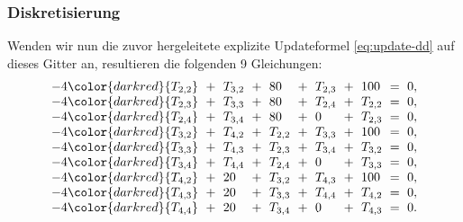 \subsubsection*{Diskretisierung}
Wenden wir nun die zuvor hergeleitete explizite Updateformel \eqref{eq:update-dd} auf dieses Gitter an, resultieren die folgenden 9 Gleichungen:
\begin{equation*}
\renewcommand{\arraycolsep}{3pt}
\begin{array}{cclclclclcl}
	-4\color{darkred}{T_{2,2}} &+& T_{3,2} &+& 80      &+& T_{2,3} &+& 100     &=& 0, \\
	-4\color{darkred}{T_{2,3}} &+& T_{3,3} &+& 80      &+& T_{2,4} &+& T_{2,2} &=& 0, \\
	-4\color{darkred}{T_{2,4}} &+& T_{3,4} &+& 80      &+& 0       &+& T_{2,3} &=& 0, \\
	-4\color{darkred}{T_{3,2}} &+& T_{4,2} &+& T_{2,2} &+& T_{3,3} &+& 100     &=& 0, \\
	-4\color{darkred}{T_{3,3}} &+& T_{4,3} &+& T_{2,3} &+& T_{3,4} &+& T_{3,2} &=& 0, \\
	-4\color{darkred}{T_{3,4}} &+& T_{4,4} &+& T_{2,4} &+& 0       &+& T_{3,3} &=& 0, \\
	-4\color{darkred}{T_{4,2}} &+& 20      &+& T_{3,2} &+& T_{4,3} &+& 100     &=& 0, \\
	-4\color{darkred}{T_{4,3}} &+& 20      &+& T_{3,3} &+& T_{4,4} &+& T_{4,2} &=& 0, \\
	-4\color{darkred}{T_{4,4}} &+& 20      &+& T_{3,4} &+& 0       &+& T_{4,3} &=& 0.
\end{array}
\end{equation*}

